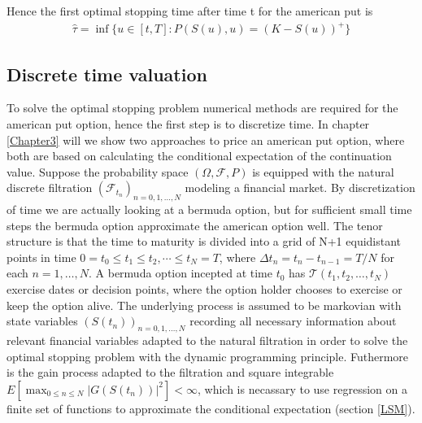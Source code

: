 Hence the first optimal stopping time after time t for the american put is
\begin{equation}
\begin{split}
\hat{\tau}= \inf\{u \in [t,T] : P(S(u),u) = (K-S(u))^+ \}
\end{split}
\end{equation}



\subsection{Discrete time valuation}\label{DiscreteValueFramework}
To solve the optimal stopping problem numerical methods are required for the american put option, hence the first step is to discretize time. In chapter \ref{Chapter3} will we show two approaches to price an american put option, where both are based on calculating the conditional expectation of the continuation value. Suppose the probability space $(\Omega, \mathcal{F}, P)$ is equipped with the natural discrete filtration $(\mathcal{F}_{t_n})_{n=0,1,\ldots,N}$ modeling a financial market. By discretization of time we are actually looking at a bermuda option, but for sufficient small time steps the bermuda option approximate the american option well. The tenor structure is that the time to maturity is divided into a grid of N+1 equidistant points in time $0=t_0\leq t_1\leq t_2, \cdots \leq t_N=T$, where $\Delta t_n = t_n-t_{n-1}=T/N$ for each $n=1, \ldots, N$. A bermuda option incepted at time $t_0$ has $\mathcal{T}(t_1,t_2,\ldots,t_N)$ exercise dates or decision points, where the option holder chooses to exercise or keep the option alive. The underlying process is assumed to be markovian with state variables $(S(t_n))_{n=0,1,\ldots,N}$ recording all necessary information about relevant financial variables adapted to the natural filtration in order to solve the optimal stopping problem with the dynamic programming principle. Futhermore is the gain process adapted to the filtration and square integrable $E[\max_{0\leq n \leq N} |G(S(t_n))|^2]<\infty$, which is necassary to use regression on a finite set of functions to approximate the conditional expectation (section \ref{LSM}).\\


